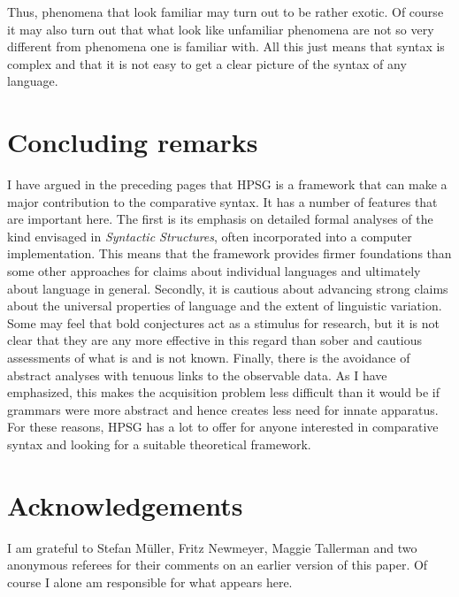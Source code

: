 \documentclass[output=paper]{langsci/langscibook}
\begin{document}
Thus, phenomena that look familiar may turn out to be rather exotic. Of course
it may also turn out that what look like unfamiliar phenomena are not so very
different from phenomena one is familiar with. All this just means that syntax
is complex and that it is not easy to get a clear picture of the syntax of any
language.

\section{Concluding remarks}\label{sec-5:conclusions}

I have argued in the preceding pages that \gls{HPSG} is a framework that can
make a major contribution to the comparative syntax. It has a number of
features that are important here. The first is its emphasis on detailed formal
analyses of the kind envisaged in \emph{Syntactic Structures}, often
incorporated into a computer implementation. This means that the framework
provides firmer foundations than some other approaches for claims about
individual languages and ultimately about language in general. Secondly, it is
cautious about advancing strong claims about the universal properties of
language and the extent of linguistic variation. Some may feel that bold
conjectures act as a stimulus for research, but it is not clear that they are
any more effective in this regard than sober and cautious assessments of what
is and is not known. Finally, there is the avoidance of abstract analyses with
tenuous links to the observable data. As I have emphasized, this makes the
acquisition problem less difficult than it would be if grammars were more
abstract and hence creates less need for innate apparatus. For these reasons,
\gls{HPSG} has a lot to offer for anyone interested in comparative syntax and
looking for a suitable theoretical framework.\largerpage

\printchapterglossary{}

\section*{Acknowledgements}

I am grateful to Stefan Müller, Fritz Newmeyer, Maggie Tallerman and two
anonymous referees for their comments on an earlier version of this paper. Of
course I alone am responsible for what appears here.

{\sloppy
\printbibliography[heading=subbibliography,notkeyword=this]
}
\end{document}
